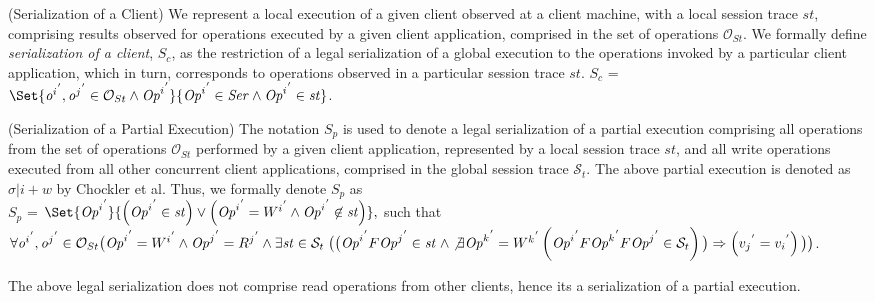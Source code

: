 \documentclass[acmlarge, ,11pt]{acmart}
\begin{document}
 \begin{definition}(Serialization of a Client)
    We  represent a local execution of a given client observed at a client machine, with a local session trace $\mathit{st} $, comprising results observed for operations executed by a given client application, comprised in the set of operations ${\mathcal{O}_{St}}$.  We formally define \emph{serialization of a client}, $S_c$, as the restriction of a legal serialization of a global execution
    to  the operations invoked by a particular client application, which in turn,
    corresponds to operations observed in a particular session trace $\mathit{st}$.
     $S_c$ = $ \Set{ {\mathit{o}^i}^{'}, {\mathit{o}^j}^{'} \in {\mathcal{O}_{St}} \wedge {\mathit{Op}^i}^{'} } {{\mathit{Op}^i}^{'} \in \mathit{Ser} \wedge {\mathit{Op}^i}^{'} \in \mathit{st} } $.
    \end{definition}\label{def:clientser}
   \begin{definition}(Serialization of a Partial Execution)
   The notation $S_p$ is used to denote a legal serialization of a partial execution comprising all    operations from the set of operations ${\mathcal{O}_{St}}$
    performed by a given client application, represented by a local session trace $\mathit{st}$, and all write
  operations  executed from all other concurrent client applications, comprised in the global session trace $\mathcal{S}_t$. The above partial execution is denoted as $\sigma |i + w$ by Chockler et al. Thus, we formally denote $S_p$ as
    \\ $S_p$ = $\Set{ {\mathit{Op}^i}^{'} } { \left( {\mathit{Op}^i}^{'} \in \mathit{st} \right) \vee \left(
   {\mathit{Op}^i}^{'} = {W^i}^{'} \wedge {\mathit{Op}^i}^{'} \not\in \mathit{st} \right)}, $ such that
   $\forall {\mathit{o}^i}^{'}, {\mathit{o}^j}^{'} \in {\mathcal{O}_{St}} \big( {\mathit{Op}^i}^{'} = {W^i}^{'} \wedge {\mathit{Op}^j}^{'} = {R^j}^{'}  \wedge \\ \exists \mathit{st} \in \mathcal{S}_t  \; \big( \big( {\mathit{Op}^i}^{'} F {\mathit{Op}^j}^{'} \in \mathit{st}  \; \wedge \not\exists {\mathit{Op}^k}^{'} = {W^k}^{'} \\ \left( {\mathit{Op}^i}^{'}  F {\mathit{Op}^k}^{'} F {\mathit{Op}^j}^{'} \in \mathcal{S}_t  \right) \big)
   \Rightarrow \left( {v_j}^{'} = {v_i}^{'} \right) \big) \big)$.
   \end{definition}\label{def:parser}
   The above legal serialization does not comprise read operations from other clients, hence its a  serialization of a partial execution.
\end{document}
